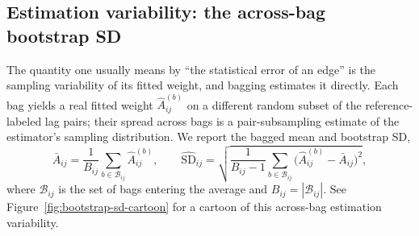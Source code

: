 \documentclass[11pt]{article}
\begin{document}
\subsection{Estimation variability: the across-bag bootstrap SD}
\label{sec:bootstrap-sd}

The quantity one usually means by ``the statistical error of an edge'' is the
sampling variability of its fitted weight, and bagging estimates it directly.
Each bag yields a real fitted weight \(\hat A^{(b)}_{ij}\) on a different
random subset of the reference-labeled lag pairs; their spread across bags
is a pair-subsampling estimate of the estimator's sampling distribution. We
report the bagged mean and bootstrap SD,
\[
\bar A_{ij}=\frac{1}{B_{ij}}\sum_{b\in\mathcal{B}_{ij}}\hat A^{(b)}_{ij},
\qquad
\widehat{\mathrm{SD}}_{ij}
=\sqrt{\frac{1}{B_{ij}-1}\sum_{b\in\mathcal{B}_{ij}}\big(\hat A^{(b)}_{ij}-\bar A_{ij}\big)^{2}},
\]
where \(\mathcal{B}_{ij}\) is the set of bags entering the average and
\(B_{ij}=|\mathcal{B}_{ij}|\).
See Figure~\ref{fig:bootstrap-sd-cartoon} for a cartoon of this across-bag
estimation variability.
\end{document}
